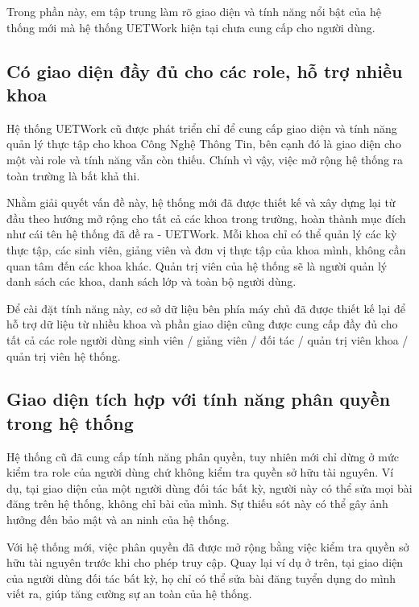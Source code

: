 \documentclass[./../main.tex]{subfiles}
\begin{document}
Trong phần này, em tập trung làm rõ giao diện và tính năng nổi bật của hệ thống mới
mà hệ thống UETWork hiện tại chưa cung cấp cho người dùng.

\hypertarget{hux1ed7-trux1ee3-ngux1b0ux1eddi-duxf9ng-thuux1ed9c-nhiux1ec1u-khoa}{%
	\subsection{Có giao diện đầy đủ cho các role, hỗ trợ nhiều khoa}\label{hux1ed7-trux1ee3-ngux1b0ux1eddi-duxf9ng-thuux1ed9c-nhiux1ec1u-khoa}}

Hệ thống UETWork cũ được phát triển chỉ để cung cấp giao diện và tính năng quản lý thực tập cho khoa Công Nghệ Thông Tin, bên cạnh đó là giao diện cho một vài role và tính năng vẫn còn thiếu. Chính vì vậy, việc mở rộng hệ thống ra toàn trường là bất khả thi.

Nhằm giải quyết vấn đề này, hệ thống mới đã được thiết kế và xây dựng lại từ đầu theo hướng mở rộng cho tất cả các khoa trong trường, hoàn thành mục đích như cái tên hệ thống đã đề ra - UETWork. Mỗi khoa chỉ có thể quản lý các kỳ thực tập, các sinh viên, giảng viên và đơn vị thực tập của khoa mình, không cần quan tâm đến các khoa khác. Quản trị viên của hệ thống sẽ là người quản lý danh sách các khoa, danh sách lớp và toàn bộ người dùng.

Để cài đặt tính năng này, cơ sở dữ liệu bên phía máy chủ đã được thiết kế lại để hỗ trợ dữ liệu từ nhiều khoa và phần giao diện cũng được cung cấp đầy đủ cho tất cả các role người dùng sinh viên / giảng viên / đối tác / quản trị viên khoa / quản trị viên hệ thống.

\hypertarget{phuxe2n-quyux1ec1n-trong-hux1ec7-thux1ed1ng}{%
	\subsection{Giao diện tích hợp với tính năng phân quyền trong hệ thống}\label{phuxe2n-quyux1ec1n-trong-hux1ec7-thux1ed1ng}}

Hệ thống cũ đã cung cấp tính năng phân quyền, tuy nhiên mới chỉ dừng ở mức kiểm tra role của người dùng chứ không kiểm tra quyền sở hữu tài nguyên. Ví dụ, tại giao diện của một người dùng đối tác bất kỳ, người này có thể sửa mọi bài đăng trên hệ thống, không chỉ bài của mình. Sự thiếu sót này có thể
gây ảnh hưởng đến bảo mật và an ninh của hệ thống.


Với hệ thống mới, việc phân quyền đã được mở rộng bằng việc kiểm tra
quyền sở hữu tài nguyên trước khi cho phép truy cập. Quay lại ví dụ ở trên,
tại giao diện của người dùng đối tác bất kỳ, họ chỉ có thể sửa bài đăng tuyển dụng do mình viết ra, giúp tăng cường sự an toàn của hệ thống.
\end{document}
